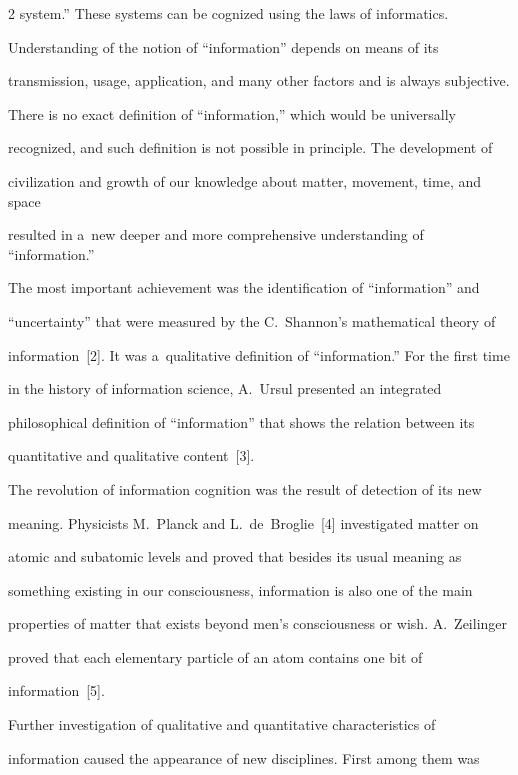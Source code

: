 \begin{multicols}{2}
system.'' These systems can be cognized using the laws of informatics.

   

   Understanding of the notion of ``information'' depends on means of its 

transmission, usage, application, and many other factors and is always subjective. 

There is no exact definition of ``information,'' which would be universally 

recognized, and such definition is not possible in principle. The development of 

civilization and growth of our knowledge about matter, movement, time, and space 

resulted in a~new deeper and more comprehensive understanding of ``information.'' 

The most important achievement was the identification of ``information'' and 

``uncertainty'' that were measured by the C.~Shannon's mathematical theory of 

information~[2]. It was a~qualitative definition of ``information.'' For the first time 

in the history of information science, A.~Ursul presented an integrated 

philosophical definition of ``information'' that shows the relation between its 

quantitative and qualitative content~[3].

   

   The revolution of information cognition was the result of detection of its new 

meaning. Physicists M.~Planck and L.~de~Broglie~[4] investigated matter on 

atomic and subatomic levels and proved that besides its usual meaning as 

something existing in our consciousness, information is also one of the main 

properties of matter that exists beyond men's consciousness or wish. A.~Zeilinger 

proved that each elementary particle of an atom contains one bit of 

information~[5]. 

   

   Further investigation of qualitative and quantitative characteristics of 

information caused the appearance of new disciplines. First among them was 


\end{multicols}
